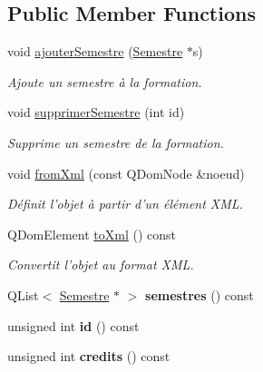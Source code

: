 \subsection*{Public Member Functions}
\begin{DoxyCompactItemize}
\item 
void \hyperlink{classFormationUtc_a9922944f1ec47720995c836b1eb7eea7}{ajouter\+Semestre} (\hyperlink{classSemestre}{Semestre} $\ast$s)
\begin{DoxyCompactList}\small\item\em Ajoute un semestre à la formation. \end{DoxyCompactList}\item 
void \hyperlink{classFormationUtc_ac3af0dcb7092a12790d979496c466466}{supprimer\+Semestre} (int id)
\begin{DoxyCompactList}\small\item\em Supprime un semestre de la formation. \end{DoxyCompactList}\item 
\hypertarget{classFormationUtc_a370bec2b5e818d45fd4b447500fb7a57}{void \hyperlink{classFormationUtc_a370bec2b5e818d45fd4b447500fb7a57}{from\+Xml} (const Q\+Dom\+Node \&noeud)}\label{classFormationUtc_a370bec2b5e818d45fd4b447500fb7a57}

\begin{DoxyCompactList}\small\item\em Définit l'objet à partir d'un élément X\+M\+L. \end{DoxyCompactList}\item 
Q\+Dom\+Element \hyperlink{classFormationUtc_a8dcda30820484cd00e82ad53a1b313f9}{to\+Xml} () const 
\begin{DoxyCompactList}\small\item\em Convertit l'objet au format X\+M\+L. \end{DoxyCompactList}\item 
\hypertarget{classFormationUtc_a144b0074f75c3ccdbd02974581758484}{Q\+List$<$ \hyperlink{classSemestre}{Semestre} $\ast$ $>$ {\bfseries semestres} () const }\label{classFormationUtc_a144b0074f75c3ccdbd02974581758484}

\item 
\hypertarget{classFormationUtc_a7f6f00890a69b763544791bf0310d892}{unsigned int {\bfseries id} () const }\label{classFormationUtc_a7f6f00890a69b763544791bf0310d892}

\item 
\hypertarget{classFormationUtc_a5b09b2e9c99fcaa643991acdab2c4117}{unsigned int {\bfseries credits} () const }\label{classFormationUtc_a5b09b2e9c99fcaa643991acdab2c4117}


\end{DoxyCompactItemize}
